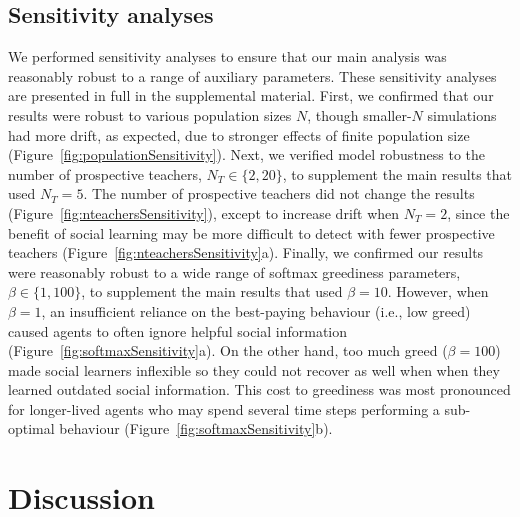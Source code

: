 \documentclass[letterpaper,11.5pt]{scrartcl}
\begin{document}
\subsection{Sensitivity analyses}

We performed sensitivity analyses to ensure that our main analysis was reasonably
robust to a range of auxiliary parameters. These sensitivity analyses are presented in full in the supplemental material. First, we confirmed that our results were robust to various population sizes $N$, though smaller-$N$ simulations had more drift, as expected, due to stronger effects of finite population size (Figure~\ref{fig:populationSensitivity}). %
Next, we verified model robustness to the number of prospective teachers, $N_T \in \{2, 20\}$, to supplement the main results that used $N_T = 5$. The number of prospective teachers did not change the results (Figure~\ref{fig:nteachersSensitivity}), except to increase drift when $N_T = 2$, since the benefit of social learning may be more difficult to detect with fewer prospective teachers (Figure~\ref{fig:nteachersSensitivity}a). Finally, we confirmed our results were reasonably robust to a wide range of softmax greediness parameters, $\beta \in \{1, 100\}$, to supplement the main results that used $\beta = 10$. However, when $\beta = 1$, an insufficient reliance on the best-paying behaviour (i.e., low greed) caused agents to often ignore helpful social information  (Figure~\ref{fig:softmaxSensitivity}a). On the other hand, too much greed ($\beta=100$) made social learners inflexible so they could not recover as well when when they learned outdated social information. This cost to greediness was most pronounced for longer-lived agents who may spend several time steps performing a sub-optimal behaviour (Figure~\ref{fig:softmaxSensitivity}b).

\section{Discussion}
\end{document}

